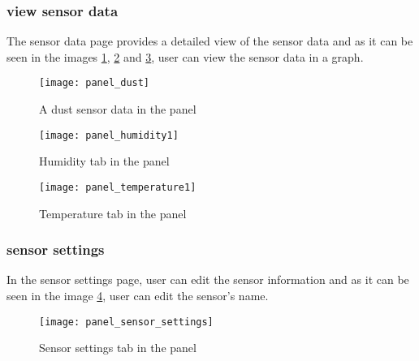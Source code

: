     \subsubsection{view sensor data}
    The sensor data page provides a detailed view of the sensor data and as it can be seen in the images \ref{panel_dust}, \ref{panel_humidity1} and \ref{panel_temperature1}, user can view the sensor data in a graph.
    \begin{figure}
        \centering
        \texttt{[image: panel\_dust]}
        \caption{A dust sensor data in the panel}
        \label{panel_dust}
    \end{figure}
    \begin{figure}
        \centering
        \texttt{[image: panel\_humidity1]}
        \caption{Humidity tab in the panel}
        \label{panel_humidity1}
    \end{figure}
    \begin{figure}
        \centering
        \texttt{[image: panel\_temperature1]}
        \caption{Temperature tab in the panel}
        \label{panel_temperature1}
    \end{figure}
    \subsubsection{sensor settings}
    In the sensor settings page, user can edit the sensor information and as it can be seen in the image \ref{panel_sensor_settings}, user can edit the sensor's name.
    \begin{figure}
        \centering
        \texttt{[image: panel\_sensor\_settings]}
        \caption{Sensor settings tab in the panel}
        \label{panel_sensor_settings}
    \end{figure}

